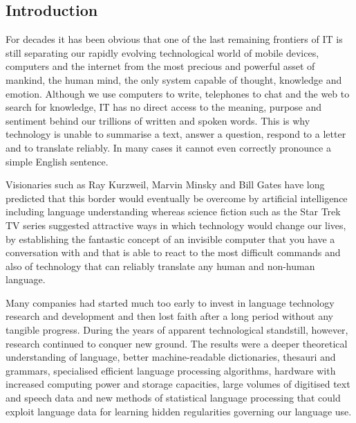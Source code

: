 \documentclass[10pt, plain]{../../metanetpaper}
\begin{document}
\clearpage



\label{sec:pts}

\begin{multicols}{2}
\subsection{Introduction}
\label{sec:pt-introduction}

For decades it has been obvious that one of the last remaining frontiers of IT is still separating our rapidly evolving technological world of mobile devices, computers and the internet from the most precious and powerful asset of mankind, the human mind, the only system capable of thought, knowledge and emotion. Although we use computers to write, telephones to chat and the web to search for knowledge, IT has no direct access to the meaning, purpose and sentiment behind our trillions of written and spoken words. This is why technology is unable to summarise a text, answer a question, respond to a letter and to translate reliably. In many cases it cannot even correctly pronounce a simple English sentence.

Visionaries such as Ray Kurzweil, Marvin Minsky and Bill Gates have long predicted that this border would eventually be overcome by artificial intelligence including language understanding whereas science fiction such as the Star Trek TV series suggested attractive ways in which technology would change our lives, by establishing the fantastic concept of an invisible computer that you have a conversation with and that is able to react to the most difficult commands and also of technology that can reliably translate any human and non-human language.

Many companies had started much too early to invest in language technology research and development and then lost faith after a long period without any tangible progress. During the years of apparent technological standstill, however, research continued to conquer new ground. The results were a deeper theoretical understanding of language, better machine-readable dictionaries, thesauri and grammars, specialised efficient language processing algorithms, hardware with increased computing power and storage capacities, large volumes of digitised text and speech data and new methods of statistical language processing that could exploit language data for learning hidden regularities governing our language use.


\end{multicols}
\end{document}

